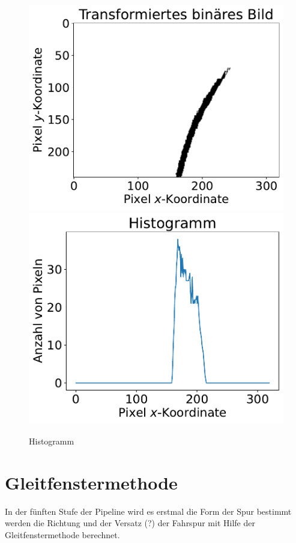 \documentclass[arbeit=studie,oneside,BCOR=12mm]{ArbeitRST}
\begin{document}
\begin{figure}[h]
    \centering
    \includegraphics[scale=0.47]{hist1}
    \includegraphics[scale=0.47]{hist2}
    \caption{Histogramm}
    \label{hist}
\end{figure}

\section{Gleitfenstermethode}

In der fünften Stufe der Pipeline wird es erstmal die Form der Spur bestimmt werden die Richtung und der Versatz (?) der
Fahrspur mit Hilfe der Gleitfenstermethode berechnet.
\end{document}
